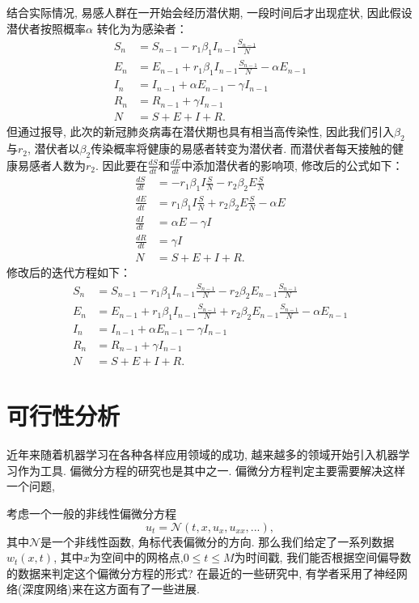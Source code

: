 \documentclass[lang=cn,11pt]{elegantpaper}
\begin{document}
结合实际情况, 易感人群在一开始会经历潜伏期, 一段时间后才出现症状, 因此假设潜伏者按照概率$\alpha$ 转化为为感染者：
\large
\begin{align*}
S_n&=S_{n-1}-r_1\beta_1 I_{n-1}\frac{S_{n-1}}{N} \\
E_n&=E_{n-1}+r_1\beta_1 I_{n-1}\frac{S_{n-1}}{N} - \alpha E_{n-1} \\ I_n&=I_{n-1}+\alpha E_{n-1}-\gamma I_{n-1}\\
R_n&=R_{n-1}+\gamma I_{n-1}\\
N&=S+E+I+R.
\end{align*}
\normalsize
但通过报导, 此次的新冠肺炎病毒在潜伏期也具有相当高传染性, 因此我们引入$\beta _2$与$r_2$, 潜伏者以$\beta_2$传染概率将健康的易感者转变为潜伏者. 而潜伏者每天接触的健康易感者人数为$r_2$. 因此要在$\frac{dS}{dt}$和$\frac{dE}{dt}$中添加潜伏者的影响项, 修改后的公式如下：
\large
\begin{align*}
\frac{dS}{d t}&=-r_1\beta_1 I\frac{S}{N}-r_2\beta _2E\frac{S}{N} \\
\frac{dE}{d t}&=r_1\beta_1 I\frac{S}{N}+r_2\beta _2E\frac{S}{N}-\alpha E\\
\frac{dI}{d t}&=\alpha E-\gamma I\\
\frac{dR}{d t}&=\gamma I\\
N&=S+E+I+R.
\end{align*}
\normalsize
修改后的迭代方程如下：
\large
\begin{align*}
S_n&=S_{n-1}-r_1\beta_1 I_{n-1}\frac{S_{n-1}}{N}-r_2\beta _2E_{n-1}\frac{S_{n-1}}{N} \\
E_n&=E_{n-1}+r_1\beta_1 I_{n-1}\frac{S_{n-1}}{N}+r_2\beta_2E_{n-1}\frac{S_{n-1}}{N}-\alpha E_{n-1} \\
I_n&=I_{n-1}+\alpha E_{n-1}-\gamma I_{n-1}\\
R_n&=R_{n-1}+\gamma I_{n-1}	\\
N&=S+E+I+R.
\end{align*}
\normalsize


\section{可行性分析}

近年来随着机器学习在各种各样应用领域的成功, 越来越多的领域开始引入机器学习作为工具. 偏微分方程的研究也是其中之一\cite{long2017pde}. 偏微分方程判定主要需要解决这样一个问题, 



考虑一个一般的非线性偏微分方程
\large
\begin{equation}
	u_t=\mathcal N(t,x,u_x,u_{xx},...),
\end{equation}
\normalsize
其中$\mathcal N$是一个非线性函数, 角标代表偏微分的方向. 那么我们给定了一系列数据$w_t(x,t)$, 其中$x$为空间中的网格点,$0\leq t\leq M$为时间戳, 我们能否根据空间偏导数的数据来判定这个偏微分方程的形式? 在最近的一些研究中, 有学者采用了神经网络(深度网络)来在这方面有了一些进展\cite{Raissi2018}.
\end{document}
